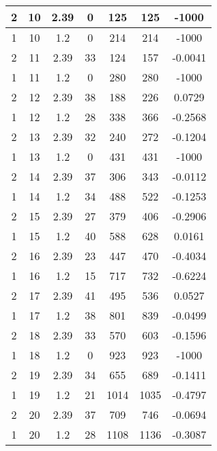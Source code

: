 \documentclass[letterpaper, 12pt]{article}
\begin{document}
\begin{longtable}{|c|c|c|c|c|c|c|}
\hline
2 & 10 & 2.39 & 0 & 125 & 125 & -1000 \\
\hline
1 & 10 & 1.2 & 0 & 214 & 214 & -1000 \\
\hline
2 & 11 & 2.39 & 33 & 124 & 157 & -0.0041 \\
\hline
1 & 11 & 1.2 & 0 & 280 & 280 & -1000 \\
\hline
2 & 12 & 2.39 & 38 & 188 & 226 & 0.0729 \\
\hline
1 & 12 & 1.2 & 28 & 338 & 366 & -0.2568 \\
\hline
2 & 13 & 2.39 & 32 & 240 & 272 & -0.1204 \\
\hline
1 & 13 & 1.2 & 0 & 431 & 431 & -1000 \\
\hline
2 & 14 & 2.39 & 37 & 306 & 343 & -0.0112 \\
\hline
1 & 14 & 1.2 & 34 & 488 & 522 & -0.1253 \\
\hline
2 & 15 & 2.39 & 27 & 379 & 406 & -0.2906 \\
\hline
1 & 15 & 1.2 & 40 & 588 & 628 & 0.0161 \\
\hline
2 & 16 & 2.39 & 23 & 447 & 470 & -0.4034 \\
\hline
1 & 16 & 1.2 & 15 & 717 & 732 & -0.6224 \\
\hline
2 & 17 & 2.39 & 41 & 495 & 536 & 0.0527 \\
\hline
1 & 17 & 1.2 & 38 & 801 & 839 & -0.0499 \\
\hline
2 & 18 & 2.39 & 33 & 570 & 603 & -0.1596 \\
\hline
1 & 18 & 1.2 & 0 & 923 & 923 & -1000 \\
\hline
2 & 19 & 2.39 & 34 & 655 & 689 & -0.1411 \\
\hline
1 & 19 & 1.2 & 21 & 1014 & 1035 & -0.4797 \\
\hline
2 & 20 & 2.39 & 37 & 709 & 746 & -0.0694 \\
\hline
1 & 20 & 1.2 & 28 & 1108 & 1136 & -0.3087 \\
\hline
\end{longtable}
\end{document}

